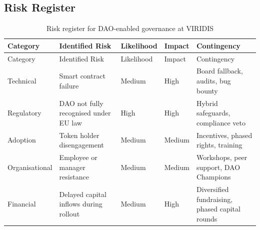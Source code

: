 \documentclass[
  english,
  12pt,
  oneside,
  open=any]{scrbook}
\begin{document}
\subsection{Risk Register}\label{risk-register}

\begin{longtable}[]{@{}
  >{\raggedright\arraybackslash}p{}
  >{\raggedright\arraybackslash}p{}
  >{\raggedright\arraybackslash}p{}
  >{\raggedright\arraybackslash}p{}
  >{\raggedright\arraybackslash}p{}@{}}
\caption{Risk register for DAO-enabled governance at
VIRIDIS}\label{tbl-risk-register}\tabularnewline
\toprule\noalign{}
\begin{minipage}[b]{\linewidth}\raggedright
Category
\end{minipage} & \begin{minipage}[b]{\linewidth}\raggedright
Identified Risk
\end{minipage} & \begin{minipage}[b]{\linewidth}\raggedright
Likelihood
\end{minipage} & \begin{minipage}[b]{\linewidth}\raggedright
Impact
\end{minipage} & \begin{minipage}[b]{\linewidth}\raggedright
Contingency
\end{minipage} \\
\midrule\noalign{}
\endfirsthead
\toprule\noalign{}
\begin{minipage}[b]{\linewidth}\raggedright
Category
\end{minipage} & \begin{minipage}[b]{\linewidth}\raggedright
Identified Risk
\end{minipage} & \begin{minipage}[b]{\linewidth}\raggedright
Likelihood
\end{minipage} & \begin{minipage}[b]{\linewidth}\raggedright
Impact
\end{minipage} & \begin{minipage}[b]{\linewidth}\raggedright
Contingency
\end{minipage} \\
\midrule\noalign{}
\endhead
\bottomrule\noalign{}
\endlastfoot
Technical & Smart contract failure & Medium & High & Board fallback,
audits, bug bounty \\
Regulatory & DAO not fully recognised under EU law & High & High &
Hybrid safeguards, compliance veto \\
Adoption & Token holder disengagement & Medium & Medium & Incentives,
phased rights, training \\
Organisational & Employee or manager resistance & Medium & Medium &
Workshops, peer support, DAO Champions \\
Financial & Delayed capital inflows during rollout & Medium & High &
Diversified fundraising, phased capital rounds \\
\end{longtable}
\end{document}
